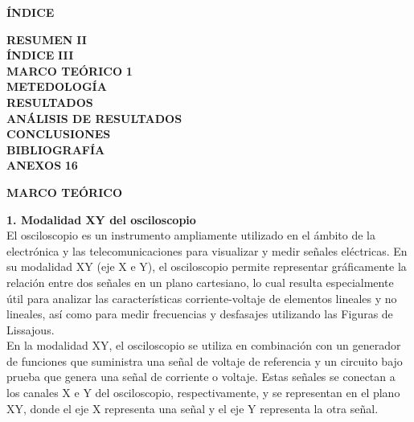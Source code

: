 \documentclass[12pt]{article}
\begin{document}
	\newpage
	
	\begin{center}
		\textbf{\large ÍNDICE}\\
	\end{center}
	
	\noindent \textbf{RESUMEN} \hfill \textbf{II}\\
	\noindent \textbf{ÍNDICE} \hfill \textbf{III}\\
	\noindent \textbf{MARCO TEÓRICO} \hfill \textbf{1}\\
	\noindent \textbf{METEDOLOGÍA} \hfill \textbf{}\\
	\noindent \textbf{RESULTADOS} \hfill \textbf{}\\
	\noindent \textbf{ANÁLISIS DE RESULTADOS} \hfill \textbf{}\\
	\noindent \textbf{CONCLUSIONES} \hfill \textbf{}\\
	\noindent \textbf{BIBLIOGRAFÍA} \hfill \textbf{}\\
	\noindent \textbf{ANEXOS} \hfill \textbf{16}\\
	
	\newpage
	
	
	\begin{center}
		\textbf{\large MARCO TEÓRICO}\\
	\end{center}
		
	\textbf{1. Modalidad XY del osciloscopio}\\
	
	El osciloscopio es un instrumento ampliamente utilizado en el ámbito de la electrónica y las telecomunicaciones para visualizar y medir señales eléctricas. En su modalidad XY (eje X e Y), el osciloscopio permite representar gráficamente la relación entre dos señales en un plano cartesiano, lo cual resulta especialmente útil para analizar las características corriente-voltaje de elementos lineales y no lineales, así como para medir frecuencias y desfasajes utilizando las Figuras de Lissajous.\\
	
	En la modalidad XY, el osciloscopio se utiliza en combinación con un generador de funciones que suministra una señal de voltaje de referencia y un circuito bajo prueba que genera una señal de corriente o voltaje. Estas señales se conectan a los canales X e Y del osciloscopio, respectivamente, y se representan en el plano XY, donde el eje X representa una señal y el eje Y representa la otra señal.\\
	
\end{document}
